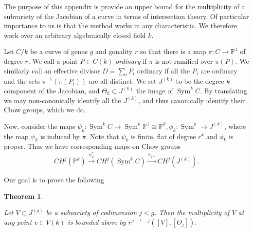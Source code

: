 \documentclass[12pt]{amsart}
\newtheorem{theorem}{Theorem}[section]
\theoremstyle{definition}
\theoremstyle{remark}
\def \Sym {\operatorname{Sym}}
\def \PP {\mathbb P}
\newcommand*{\ra}{\rightarrow}
\newcommand*{\xra}{\xrightarrow}
\begin{document}
The purpose of this appendix is provide an upper bound for the multiplicity of a subvariety of the Jacobian of a curve in terms of intersection theory. Of particular importance to
us is that the method works in any characteristic. We therefore work over an arbitrary algebraically closed field $k$.

Let $C/k$ be a curve of genus $g$ and gonality $r$ so that there is a map $\pi:C\ra \PP^1$ of degree $r$. We call a point $P\in C(k)$ \emph{ordinary}
if $\pi$ is not ramified over $\pi(P)$. We similarly call an effective divisor $D=\sum_i P_i$ ordinary if all the $P_i$ are ordinary and the sets $\pi^{-1}(\pi(P_i))$ are all distinct. 
We set  $J^{(k)}$ to be the degree $k$ component of the Jacobian, and $\Theta_k\subset J^{(k)}$ the image of $\Sym^kC$. By translating we 
may non-canonically identify all the $J^{(k)}$, and thus canonically identify their Chow groups, which we do.

Now, consider the maps $\psi_k:\Sym^k C \ra \Sym^k\PP^1 \cong \PP^k, \phi_k:\Sym^k \ra J^{(k)}$, where the map $\psi_k$ is induced by $\pi$. Note that $\psi_k$ is finite, flat of degree 
$r^k$ and $\phi_k$ is proper. Thus we have corresponding maps on Chow groups \[CH^j(\PP^k)\xra{\psi_k^*} CH^j(\Sym^k C)\xra{\phi_{k*}} CH^j(J^{(k)}).\] 

Our goal is to prove the following

\begin{theorem}\label{appendix}

Let $V\subset J^{(g)}$ be a subvariety of codimension $j<g$. Then the multiplicity of $V$ at any point $v\in V(k)$ is bounded above by $r^{g-1-j} ([V],[\Theta_j])$. 

\end{theorem}  
\end{document}
